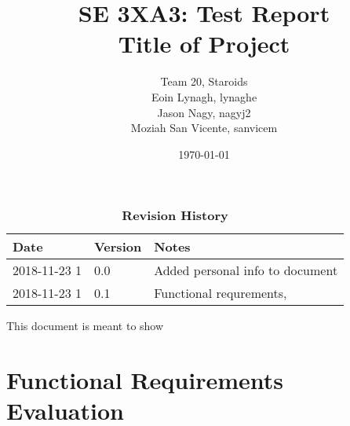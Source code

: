 \documentclass[12pt, titlepage]{article}
\title{SE 3XA3: Test Report\\Title of Project}
\author{Team 20, Staroids
		\\ Eoin Lynagh, lynaghe
		\\ Jason Nagy, nagyj2
		\\ Moziah San Vicente, sanvicem
}
\date{\today}
\begin{document}
\maketitle

\tableofcontents
\listoftables
\listoffigures

\begin{table}[bp]
\caption{\bf Revision History}
\begin{tabularx}{\textwidth}{p{3cm}p{2cm}X}
\toprule {\bf Date} & {\bf Version} & {\bf Notes}\\
\midrule
2018-11-23 1 & 0.0 & Added personal info to document\\
2018-11-23 1 & 0.1 & Functional requrements, \\
\bottomrule
\end{tabularx}
\end{table}

\newpage


This document is meant to show \\

\section{Functional Requirements Evaluation}
\end{document}

